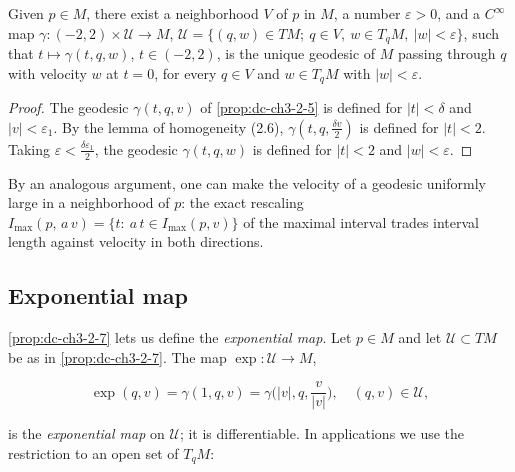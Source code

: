 \begin{proposition}
  \label{prop:dc-ch3-2-7}
  \leanok
  \notready
  Given $p\in M$, there exist a neighborhood $V$ of $p$ in $M$, a number
  $\varepsilon>0$, and a $C^\infty$ map $\gamma:(-2,2)\times\mathcal{U}\to M$,
  $\mathcal{U}=\{(q,w)\in TM;\ q\in V,\ w\in T_qM,\ |w|<\varepsilon\}$, such that
  $t\mapsto\gamma(t,q,w)$, $t\in(-2,2)$, is the unique geodesic of $M$ passing
  through $q$ with velocity $w$ at $t=0$, for every $q\in V$ and $w\in T_qM$ with
  $|w|<\varepsilon$.
\end{proposition}
\begin{proof}
  \leanok
  \sketch
  The geodesic $\gamma(t,q,v)$ of \cref{prop:dc-ch3-2-5} is defined for
  $|t|<\delta$ and $|v|<\varepsilon_1$. By the lemma of homogeneity (2.6),
  $\gamma(t,q,\frac{\delta v}{2})$ is defined for $|t|<2$. Taking
  $\varepsilon<\frac{\delta\varepsilon_1}{2}$, the geodesic $\gamma(t,q,w)$ is
  defined for $|t|<2$ and $|w|<\varepsilon$.
\end{proof}

\begin{remark}
  \label{rem:dc-ch3-2-8}
  \leanok
  By an analogous argument, one can make the velocity of a geodesic uniformly large
  in a neighborhood of $p$: the exact rescaling
  $I_{\max}(p,\,a\,v)=\{t:\ a\,t\in I_{\max}(p,v)\}$ of the maximal interval
  trades interval length against velocity in both directions.
\end{remark}

\subsection{Exponential map}
\cref{prop:dc-ch3-2-7} lets us define the \emph{exponential map}. Let $p\in M$ and let
$\mathcal{U}\subset TM$ be as in \cref{prop:dc-ch3-2-7}. The map $\exp:\mathcal{U}\to M$,

$$
\exp(q,v)=\gamma(1,q,v)=\gamma\Big(|v|,q,\frac{v}{|v|}\Big),\quad(q,v)\in\mathcal{U},
$$

is the \emph{exponential map} on $\mathcal{U}$; it is differentiable. In applications
we use the restriction to an open set of $T_qM$:

